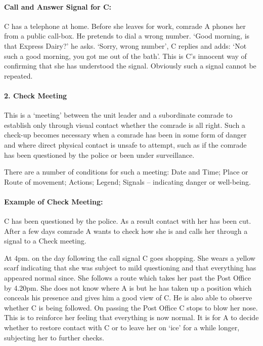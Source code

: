 \paragraph{Call and Answer Signal for C:}

C has a telephone at home. Before she leaves for work, comrade A phones
her from a public call-box. He pretends to dial a wrong number. `Good
morning, is that Express Dairy?' he asks. `Sorry, wrong number', C
replies and adds: `Not such a good morning, you got me out of the bath'.
This is C's innocent way of confirming that she has understood the
signal. Obviously such a signal cannot be repeated.

\paragraph{2. Check Meeting}

This is a `meeting' between the unit leader and a subordinate comrade to
establish only through visual contact whether the comrade is all right.
Such a check-up becomes necessary when a comrade has been in some form
of danger and where direct physical contact is unsafe to attempt, such
as if the comrade has been questioned by the police or been under
surveillance.

There are a number of conditions for such a meeting: Date and Time;
Place or Route of movement; Actions; Legend; Signals -- indicating
danger or well-being.

\paragraph{Example of Check Meeting:}

C has been questioned by the police. As a result contact with her has
been cut. After a few days comrade A wants to check how she is and calls
her through a signal to a Check meeting.

At 4pm. on the day following the call signal C goes shopping. She wears
a yellow scarf indicating that she was subject to mild questioning and
that everything has appeared normal since. She follows a route which
takes her past the Post Office by 4.20pm. She does not know where A is
but he has taken up a position which conceals his presence and gives him
a good view of C. He is also able to observe whether C is being
followed. On passing the Post Office C stops to blow her nose. This is
to reinforce her feeling that everything is now normal. It is for A to
decide whether to restore contact with C or to leave her on `ice' for a
while longer, subjecting her to further checks.

